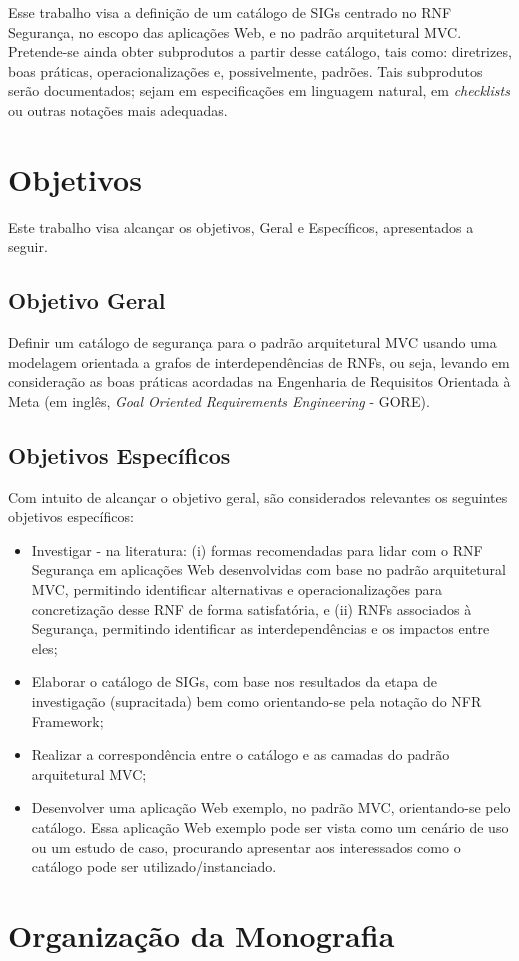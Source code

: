 Esse trabalho visa a definição de um catálogo de SIGs centrado no RNF Segurança, no escopo das aplicações Web, e no padrão arquitetural MVC. Pretende-se ainda obter subprodutos a partir desse catálogo, tais como: diretrizes, boas práticas, operacionalizações e, possivelmente, padrões. Tais subprodutos serão documentados; sejam em especificações em linguagem natural, em \textit{checklists}  ou outras notações mais adequadas.

\section{Objetivos}

Este trabalho visa alcançar os objetivos, Geral e Específicos, apresentados a seguir.  

\subsection{Objetivo Geral}

Definir um catálogo de segurança para o padrão arquitetural MVC usando uma modelagem orientada a grafos de interdependências de RNFs, ou seja, levando em consideração as boas práticas acordadas na Engenharia de Requisitos Orientada à Meta (em inglês, \textit{Goal Oriented Requirements Engineering} - GORE). 

\subsection{Objetivos Específicos}

Com intuito de alcançar o objetivo geral, são considerados relevantes os seguintes objetivos específicos:

\begin{itemize}
	
	\item Investigar - na literatura: (i) formas recomendadas para lidar com o RNF Segurança em aplicações Web desenvolvidas com base no padrão arquitetural MVC, permitindo identificar alternativas e operacionalizações para concretização desse RNF de forma satisfatória, e (ii) RNFs associados à Segurança, permitindo identificar as interdependências e os impactos entre eles;
	
	\item Elaborar o catálogo de SIGs, com base nos resultados da etapa de investigação (supracitada) bem como orientando-se pela notação do NFR Framework;
	
	\item Realizar a correspondência entre o  catálogo e as camadas do padrão arquitetural MVC;
	
	\item Desenvolver uma aplicação Web exemplo, no padrão MVC, orientando-se pelo catálogo. Essa aplicação Web exemplo pode ser vista como um cenário de uso ou um estudo de caso, procurando apresentar aos interessados como o catálogo pode ser utilizado/instanciado. 
	
\end{itemize}

\section{Organização da Monografia}
